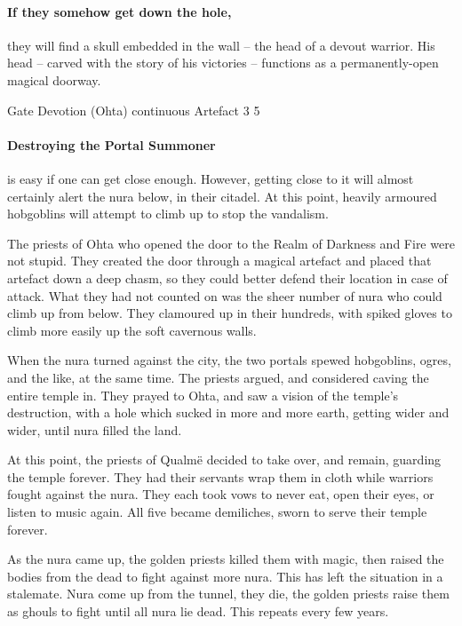 \begin{multicols}{2}
\paragraph{If they somehow get down the hole,}
they will find a skull embedded in the wall -- the head of a devout warrior.
His head -- carved with the story of his victories -- functions as a permanently-open magical doorway.

  {Gate}%
  {Devotion (Ohta)}%
  {continuous}%
  {Artefact}%
  {3}%
  {5}%

\paragraph{Destroying the Portal Summoner}
is easy if one can get close enough.
However, getting close to it will almost certainly alert the nura below, in their citadel.
At this point, heavily armoured hobgoblins will attempt to climb up to stop the vandalism.

\hobgoblin

\begin{exampletext}

  The priests of Ohta who opened the door to the Realm of Darkness and Fire%
  \iftoggle{aif}{%
    \footnote{See page \pageref{darknessandfire} for more on that realm.}
  }{}%
 were not stupid.
 They created the door through a magical artefact and placed that artefact down a deep chasm, so they could better defend their location in case of attack.
  What they had not counted on was the sheer number of nura who could climb up from below.
  They clamoured up in their hundreds, with spiked gloves to climb more easily up the soft cavernous walls.

  When the nura turned against the city, the two portals spewed hobgoblins, ogres, and the like, at the same time.
  The priests argued, and considered caving the entire temple in.
  They prayed to Ohta, and saw a vision of the temple's destruction, with a hole which sucked in more and more earth, getting wider and wider, until nura filled the land.

  At this point, the priests of Qualm\"e decided to take over, and remain, guarding the temple forever.
  They had their servants wrap them in cloth while warriors fought against the nura.
  They each took vows to never eat, open their eyes, or listen to music again.
  All five became demiliches, sworn to serve their temple forever.

  As the nura came up, the golden priests killed them with magic, then raised the bodies from the dead to fight against more nura.
  This has left the situation in a stalemate.
  Nura come up from the tunnel, they die, the golden priests raise them as ghouls to fight until all nura lie dead.
  This repeats every few years.


\end{exampletext}
\end{multicols}
